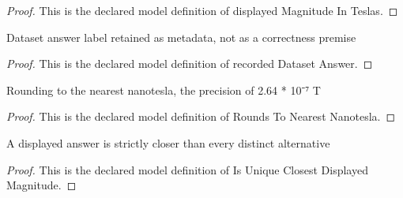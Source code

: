 \begin{proof}
  This is the declared model definition of displayed Magnitude In Teslas.
\end{proof}
\begin{definition}
  \label{def:physics:phyx-mini-0960:phyxminiproblems-problemphyxmini0960-recordeddatasetanswer}
  Dataset answer label retained as metadata, not as a correctness premise
\end{definition}
\begin{proof}
  This is the declared model definition of recorded Dataset Answer.
\end{proof}
\begin{definition}
  \label{def:physics:phyx-mini-0960:phyxminiproblems-problemphyxmini0960-roundstonearestnanotesla}
  Rounding to the nearest nanotesla, the precision of 2.64 * 10⁻⁷ T
\end{definition}
\begin{proof}
  This is the declared model definition of Rounds To Nearest Nanotesla.
\end{proof}
\begin{definition}
  \label{def:physics:phyx-mini-0960:phyxminiproblems-problemphyxmini0960-isuniqueclosestdisplayedmagnitude}
  A displayed answer is strictly closer than every distinct alternative
\end{definition}
\begin{proof}
  This is the declared model definition of Is Unique Closest Displayed Magnitude.
\end{proof}
